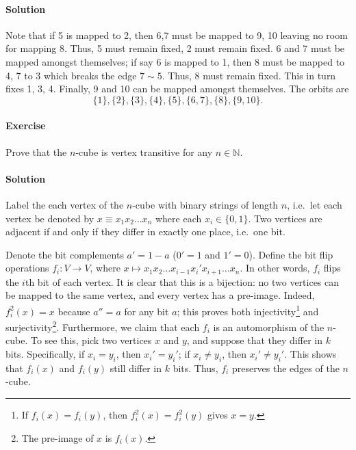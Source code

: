 \documentclass[10pt]{article}
\newcounter{prob}
\newcommand{\problem}{\stepcounter{prob}\paragraph{Exercise \arabic{prob}}}
\newcommand{\solution}{\paragraph{Solution}}
\newcommand{\N}{\mathbb{N}}
\begin{document}
\begin{enumerate}
\begin{center}
        \end{center}

        \solution Note that if 5 is mapped to 2, then 6,7 must be mapped to 9, 10
        leaving no room for mapping 8. Thus, 5 must remain fixed, 2 must remain
        fixed. 6 and 7 must be mapped amongst themselves; if say 6 is mapped to 1,
        then 8 must be mapped to 4, 7 to 3 which breaks the edge $7 \sim 5$. Thus, 8
        must remain fixed. This in turn fixes 1, 3, 4. Finally, 9 and 10 can be
        mapped amongst themselves. The orbits are \[
            \{1\}, \{2\}, \{3\}, \{4\}, \{5\}, \{6, 7\}, \{8\}, \{9, 10\}.
        \] 


    \end{enumerate}




    \problem Prove that the $n$-cube is vertex transitive for any $n \in \N$.

    \solution Label the each vertex of the $n$-cube with binary strings of length
    $n$, i.e.\ let each vertex be denoted by $x \equiv x_1x_2 \dots x_n$ where each
    $x_i \in \{0, 1\}$. Two vertices are adjacent if and only if they differ in
    exactly one place, i.e.\ one bit.

    Denote the bit complements $a' = 1 - a$ ($0' = 1$ and $1' = 0$). Define the bit
    flip operations $f_i\colon V \to V$, where $x \mapsto x_1x_2 \dots x_{i -
    1}x_i'x_{i + 1} \dots x_n$. In other words, $f_i$ flips the $i$th bit of each
    vertex. It is clear that this is a bijection: no two vertices can be mapped to
    the same vertex, and every vertex has a pre-image. Indeed, $f_i^2(x) = x$ because
    $a'' = a$ for any bit $a$; this proves both injectivity\footnote{If $f_i(x) =
    f_i(y)$, then $f_i^2(x) = f_i^2(y)$ gives $x = y$.} and surjectivity\footnote{The
    pre-image of $x$ is $f_i(x)$.}. Furthermore, we claim that each $f_i$ is an
    automorphism of the $n$-cube. To see this, pick two vertices $x$ and $y$, and
    suppose that they differ in $k$ bits. Specifically, if $x_i = y_i$, then $x_i' =
    y_i'$; if $x_i \neq y_i$, then $x_i' \neq y_i'$. This shows that $f_i(x)$ and
    $f_i(y)$ still differ in $k$ bits. Thus, $f_i$ preserves the edges of the
    $n$-cube.
\end{document}
